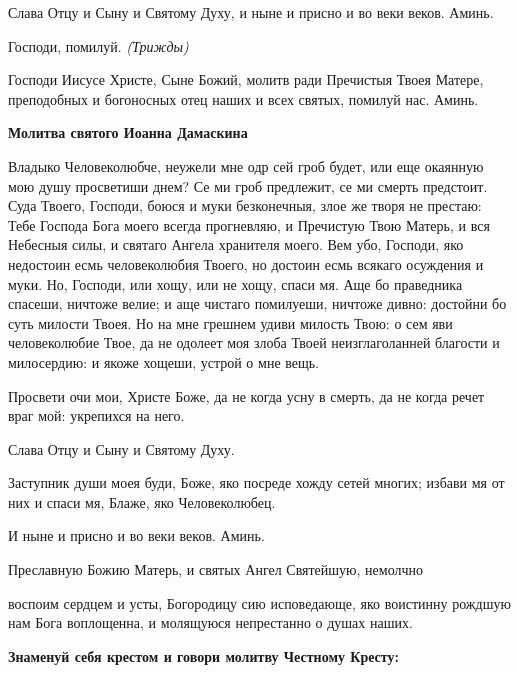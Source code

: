    Слава Отцу и Сыну и Святому Духу, и ныне и присно и во веки веков.
Аминь.



   Господи, помилуй. \itshape  (Трижды)\normalfont{}



   Господи Иисусе Христе, Сыне Божий, молитв ради Пречистыя Твоея
Матере, преподобных и богоносных отец наших и всех святых, помилуй нас.
Аминь.



 

\bfseries Молитва святого Иоанна Дамаскина\normalfont{}


   Владыко Человеколюбче, неужели мне одр сей гроб будет, или еще
окаянную мою душу просветиши днем? Се ми гроб предлежит, се ми смерть
предстоит. Суда Твоего, Господи, боюся и муки безконечныя, злое же творя
не престаю: Тебе Господа Бога моего всегда прогневляю, и Пречистую Твою
Матерь, и вся Небесныя силы, и святаго Ангела хранителя моего. Вем убо,
Господи, яко недостоин есмь человеколюбия Твоего, но достоин есмь всякаго
осуждения и муки. Но, Господи, или хощу, или не хощу, спаси мя. Аще бо
праведника спасеши, ничтоже велие; и аще чистаго помилуеши, ничтоже
дивно: достойни бо суть милости Твоея. Но на мне грешнем удиви милость
Твою: о сем яви человеколюбие Твое, да не одолеет моя злоба Твоей
неизглаголанней благости и милосердию: и якоже хощеши, устрой о мне
вещь.



   Просвети очи мои, Христе Боже, да не когда усну в смерть, да не когда
речет враг мой: укрепихся на него.



   Слава Отцу и Сыну и Святому Духу.



   Заступник души моея буди, Боже, яко посреде хожду сетей многих;
избави мя от них и спаси мя, Блаже, яко Человеколюбец.



   И ныне и присно и во веки веков. Аминь.



   Преславную Божию Матерь, и святых Ангел Святейшую, немолчно

воспоим сердцем и усты, Богородицу сию исповедающе, яко воистинну
рождшую нам Бога воплощенна, и молящуюся непрестанно о душах
наших.



 

\bfseries Знаменуй себя крестом и говори молитву Честному Кресту:\normalfont{}


